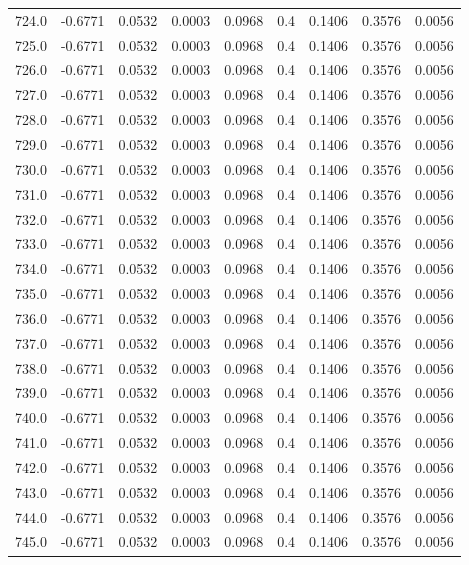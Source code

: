 \begin{longtable}{lrrrrrrrr}
724.0 & -0.6771 & 0.0532 & 0.0003 & 0.0968 & 0.4 & 0.1406 & 0.3576 & 0.0056 \\
725.0 & -0.6771 & 0.0532 & 0.0003 & 0.0968 & 0.4 & 0.1406 & 0.3576 & 0.0056 \\
726.0 & -0.6771 & 0.0532 & 0.0003 & 0.0968 & 0.4 & 0.1406 & 0.3576 & 0.0056 \\
727.0 & -0.6771 & 0.0532 & 0.0003 & 0.0968 & 0.4 & 0.1406 & 0.3576 & 0.0056 \\
728.0 & -0.6771 & 0.0532 & 0.0003 & 0.0968 & 0.4 & 0.1406 & 0.3576 & 0.0056 \\
729.0 & -0.6771 & 0.0532 & 0.0003 & 0.0968 & 0.4 & 0.1406 & 0.3576 & 0.0056 \\
730.0 & -0.6771 & 0.0532 & 0.0003 & 0.0968 & 0.4 & 0.1406 & 0.3576 & 0.0056 \\
731.0 & -0.6771 & 0.0532 & 0.0003 & 0.0968 & 0.4 & 0.1406 & 0.3576 & 0.0056 \\
732.0 & -0.6771 & 0.0532 & 0.0003 & 0.0968 & 0.4 & 0.1406 & 0.3576 & 0.0056 \\
733.0 & -0.6771 & 0.0532 & 0.0003 & 0.0968 & 0.4 & 0.1406 & 0.3576 & 0.0056 \\
734.0 & -0.6771 & 0.0532 & 0.0003 & 0.0968 & 0.4 & 0.1406 & 0.3576 & 0.0056 \\
735.0 & -0.6771 & 0.0532 & 0.0003 & 0.0968 & 0.4 & 0.1406 & 0.3576 & 0.0056 \\
736.0 & -0.6771 & 0.0532 & 0.0003 & 0.0968 & 0.4 & 0.1406 & 0.3576 & 0.0056 \\
737.0 & -0.6771 & 0.0532 & 0.0003 & 0.0968 & 0.4 & 0.1406 & 0.3576 & 0.0056 \\
738.0 & -0.6771 & 0.0532 & 0.0003 & 0.0968 & 0.4 & 0.1406 & 0.3576 & 0.0056 \\
739.0 & -0.6771 & 0.0532 & 0.0003 & 0.0968 & 0.4 & 0.1406 & 0.3576 & 0.0056 \\
740.0 & -0.6771 & 0.0532 & 0.0003 & 0.0968 & 0.4 & 0.1406 & 0.3576 & 0.0056 \\
741.0 & -0.6771 & 0.0532 & 0.0003 & 0.0968 & 0.4 & 0.1406 & 0.3576 & 0.0056 \\
742.0 & -0.6771 & 0.0532 & 0.0003 & 0.0968 & 0.4 & 0.1406 & 0.3576 & 0.0056 \\
743.0 & -0.6771 & 0.0532 & 0.0003 & 0.0968 & 0.4 & 0.1406 & 0.3576 & 0.0056 \\
744.0 & -0.6771 & 0.0532 & 0.0003 & 0.0968 & 0.4 & 0.1406 & 0.3576 & 0.0056 \\
745.0 & -0.6771 & 0.0532 & 0.0003 & 0.0968 & 0.4 & 0.1406 & 0.3576 & 0.0056 \\

\end{longtable}
